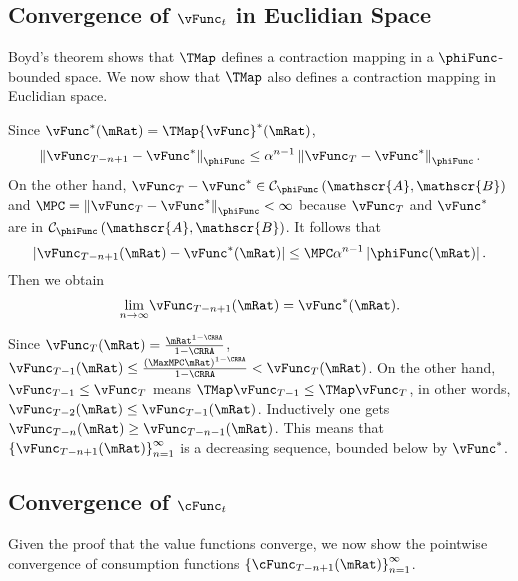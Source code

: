 \documentclass[titlepage]{\econtex}\providecommand{\texname}{BufferStockTheory}
\begin{document}
\subsection{Convergence of $\vFunc_{t}$ in Euclidian Space}\label{sec:vEuclidian}

Boyd's theorem shows that $\TMap$ defines a contraction mapping
in a $\phiFunc$-bounded space. We now show that $\TMap$ also
defines a contraction mapping in Euclidian space.

Since $\vFunc^{\ast }(\mRat)=\TMap {\vFunc}^{\ast }(\mRat)$,
\begin{equation}
\left\Vert \vFunc_{T-n+1}-\vFunc^{\ast }\right\Vert _{\phiFunc }\leq \Shrinker
^{n-1}\left\Vert \vFunc_{T}-\vFunc^{\ast }\right\Vert _{\phiFunc }.
\end{equation}%
On the other hand, $\vFunc_{T}-\vFunc^{\ast }\in \mathcal{C}_{\phiFunc }\left( \mathscr{A},
\mathscr{B}\right) $ and $\MPC =\left\Vert \vFunc_{T}-\vFunc^{\ast }\right\Vert_{\phiFunc }<\infty $ because $\vFunc_{T}$ and $\vFunc^{\ast }$ are in $\mathcal{C}_{\phiFunc
}\left( \mathscr{A},\mathscr{B}\right) $. It follows that%
\begin{equation}
\left\vert \vFunc_{T-n+1}(\mRat)-\vFunc^{\ast }(\mRat)\right\vert \leq \MPC \Shrinker^{n-1}\left\vert \phiFunc(\mRat)\right\vert.
\end{equation}%
Then we obtain
\begin{equation}
\underset{n\rightarrow \infty }{\lim }\vFunc_{T-n+1}(\mRat)=\vFunc^{\ast }(\mRat).
\end{equation}

Since $\vFunc_{T}(\mRat)=\frac{\mRat^{1-\CRRA }}{1-\CRRA }$, $\vFunc_{T-1}(\mRat)\leq \frac{\left(\MaxMPC \mRat\right)^{1-\CRRA}}{1-\CRRA}<\vFunc_{T}(\mRat)$. On the other hand, $\vFunc_{T-1}\leq \vFunc_{T}$
means $\TMap\vFunc_{T-1}\leq \TMap\vFunc_{T}$, in other words, $\vFunc_{T-2}(\mRat)\leq \vFunc_{T-1}(\mRat)$.
Inductively one gets $\vFunc_{T-n}(\mRat)\geq \vFunc_{T-n-1}(\mRat)$. This means that $\left\{
\vFunc_{T-n+1}(\mRat)\right\} _{n=1}^{\infty }$ is a decreasing sequence,
bounded below by $\vFunc^{\ast}$.


\subsection{Convergence of $\cFunc_{t}$}\label{sec:cConverges}\label{sec:cEuclidian}

Given the proof that the value functions converge, we now show the
pointwise convergence of consumption functions
$\left\{\cFunc_{T-n+1}(\mRat)\right\} _{n=1}^{\infty }$.
\end{document}
